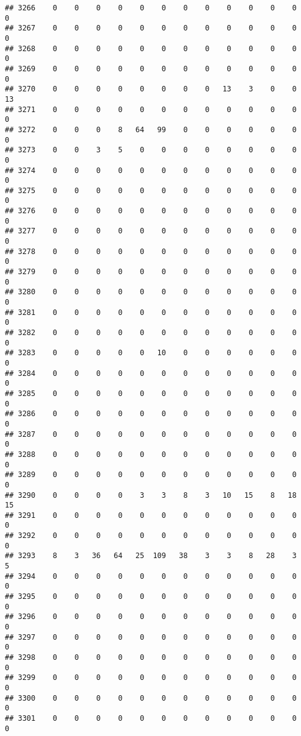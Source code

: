 \documentclass[]{article}
\begin{document}
\begin{verbatim}
## 3266    0    0    0    0    0    0    0    0    0    0    0    0    0
## 3267    0    0    0    0    0    0    0    0    0    0    0    0    0
## 3268    0    0    0    0    0    0    0    0    0    0    0    0    0
## 3269    0    0    0    0    0    0    0    0    0    0    0    0    0
## 3270    0    0    0    0    0    0    0    0   13    3    0    0   13
## 3271    0    0    0    0    0    0    0    0    0    0    0    0    0
## 3272    0    0    0    8   64   99    0    0    0    0    0    0    0
## 3273    0    0    3    5    0    0    0    0    0    0    0    0    0
## 3274    0    0    0    0    0    0    0    0    0    0    0    0    0
## 3275    0    0    0    0    0    0    0    0    0    0    0    0    0
## 3276    0    0    0    0    0    0    0    0    0    0    0    0    0
## 3277    0    0    0    0    0    0    0    0    0    0    0    0    0
## 3278    0    0    0    0    0    0    0    0    0    0    0    0    0
## 3279    0    0    0    0    0    0    0    0    0    0    0    0    0
## 3280    0    0    0    0    0    0    0    0    0    0    0    0    0
## 3281    0    0    0    0    0    0    0    0    0    0    0    0    0
## 3282    0    0    0    0    0    0    0    0    0    0    0    0    0
## 3283    0    0    0    0    0   10    0    0    0    0    0    0    0
## 3284    0    0    0    0    0    0    0    0    0    0    0    0    0
## 3285    0    0    0    0    0    0    0    0    0    0    0    0    0
## 3286    0    0    0    0    0    0    0    0    0    0    0    0    0
## 3287    0    0    0    0    0    0    0    0    0    0    0    0    0
## 3288    0    0    0    0    0    0    0    0    0    0    0    0    0
## 3289    0    0    0    0    0    0    0    0    0    0    0    0    0
## 3290    0    0    0    0    3    3    8    3   10   15    8   18   15
## 3291    0    0    0    0    0    0    0    0    0    0    0    0    0
## 3292    0    0    0    0    0    0    0    0    0    0    0    0    0
## 3293    8    3   36   64   25  109   38    3    3    8   28    3    5
## 3294    0    0    0    0    0    0    0    0    0    0    0    0    0
## 3295    0    0    0    0    0    0    0    0    0    0    0    0    0
## 3296    0    0    0    0    0    0    0    0    0    0    0    0    0
## 3297    0    0    0    0    0    0    0    0    0    0    0    0    0
## 3298    0    0    0    0    0    0    0    0    0    0    0    0    0
## 3299    0    0    0    0    0    0    0    0    0    0    0    0    0
## 3300    0    0    0    0    0    0    0    0    0    0    0    0    0
## 3301    0    0    0    0    0    0    0    0    0    0    0    0    0

\end{verbatim}
\end{document}
